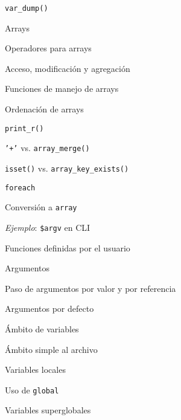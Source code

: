 \begin{longenum}
\begin{longenum}
\begin{longenum}
            \item \texttt{var\_dump()}
        \end{longenum}
        \item Arrays
        \begin{longenum}
            \item Operadores para arrays
            \begin{longenum}
                \item Acceso, modificación y agregación
            \end{longenum}
            \item Funciones de manejo de arrays
            \begin{longenum}
                \item Ordenación de arrays
                \item \texttt{print\_r()}
                \item \texttt{'+'} vs. \texttt{array\_merge()}
                \item \texttt{isset()} vs. \texttt{array\_key\_exists()}
            \end{longenum}
            \item \texttt{foreach}
            \item Conversión a \texttt{array}
            \item \textit{Ejemplo}: \texttt{\$argv} en CLI
        \end{longenum}
        \item Funciones definidas por el usuario
        \begin{longenum}
            \item Argumentos
            \begin{longenum}
                \item Paso de argumentos por valor y por referencia
                \item Argumentos por defecto
            \end{longenum}
            \item Ámbito de variables
            \begin{longenum}
                \item Ámbito simple al archivo
                \item Variables locales
                \item Uso de \texttt{global}
                \item Variables superglobales
            \end{longenum}

\end{longenum}
\end{longenum}
\end{longenum}
